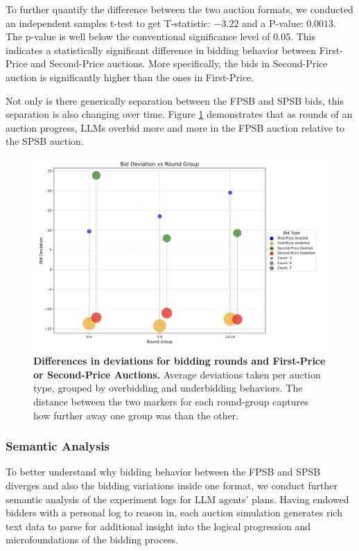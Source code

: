 \documentclass{article} %
\begin{document}
To further quantify the difference between the two auction formats, we conducted an independent samples t-test to get T-statistic: \(-3.22\) and a P-value: \(0.0013\).
The p-value is well below the conventional significance level of 0.05. 
This indicates a statistically significant difference in bidding behavior between First-Price and Second-Price auctions. 
More specifically, the bids in Second-Price auction is significantly higher than the ones in First-Price.

Not only is there generically separation between the FPSB and SPSB bids, this separation is also changing over time. 
Figure \ref{fig:FPSBvsSPSBbyTime} demonstrates that as rounds of an auction progress, LLMs overbid more and more in the FPSB auction relative to the SPSB auction.

\begin{figure}[h!]
    \centering 
    \hspace{2cm}\includegraphics[width=0.75\linewidth]{Figs/FP_SP_round.png}
    \caption{\textbf{ Differences in deviations for bidding rounds and First-Price or Second-Price Auctions.} Average deviations taken per auction type, grouped by overbidding and underbidding behaviors. The distance between the two markers for each round-group captures how further away one group was than the other. }
    \label{fig:FPSBvsSPSBbyTime}
\end{figure}






\subsubsection{Semantic Analysis}

To better understand why bidding behavior between the FPSB and SPSB diverges and also the bidding variations inside one format, we conduct further semantic analysis of the experiment logs for LLM agents' plans. Having endowed bidders with a personal log to reason in, each auction simulation generates rich text data to parse for additional insight into the logical progression and microfoundations of the bidding process.
\end{document}
